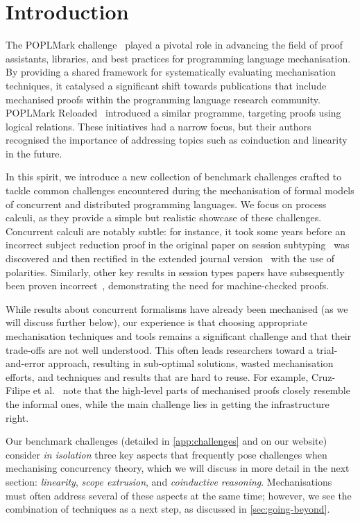 \documentclass[runningheads]{llncs}
\begin{document}
\section{Introduction}
The POPLMark challenge~\cite{POPLMark}
played a pivotal role in advancing the field of proof assistants,
libraries, and best practices for programming language
mechanisation. By providing a shared framework for systematically
evaluating mechanisation techniques, it catalysed a significant
shift towards publications that include mechanised proofs within the programming language research community.
POPLMark Reloaded~\cite{POPLMarkReloaded} introduced a similar programme, targeting proofs using logical relations.
These initiatives had a narrow focus, but their authors recognised the importance of addressing topics such as coinduction and linearity in the future.

In this spirit, we introduce a new collection of benchmark challenges
crafted to tackle common challenges encountered during
the mechanisation of formal models of concurrent and distributed
programming languages.  We focus on process calculi, as
they provide a simple but realistic showcase of these challenges.  Concurrent calculi are
notably subtle: for instance, it took some years before an incorrect
subject reduction proof in the original paper on session
subtyping~\cite{GH99} was discovered and then rectified in the extended journal version~\cite{GH05} with the use of
polarities.
Similarly, other key results in session types papers have subsequently
been proven incorrect~\cite{Gay2020,10.1145/3290343}, demonstrating the
need for machine-checked proofs.

While results about concurrent
formalisms have already been mechanised (as we will discuss further
below), our experience is that choosing appropriate mechanisation
techniques and tools remains a significant challenge and that their
trade-offs are not well understood.  This often leads researchers
toward a trial-and-error approach, resulting in sub-optimal solutions,
wasted mechanisation efforts, and techniques and results that are hard
to reuse. For example, Cruz-Filipe et al.~\cite{Cruz-Filipe2021b} note that the high-level parts of
mechanised proofs closely resemble the informal ones, while the
main challenge lies in getting the infrastructure right.

Our benchmark challenges (detailed in \cref{app:challenges} and on our website) consider
\emph{in isolation} three key aspects that frequently pose challenges
when mechanising concurrency theory, which we will discuss in more detail in the next section: \emph{linearity}, \emph{scope
  extrusion}, and \emph{coinductive reasoning}.
Mechanisations must often address several of these aspects at the same time; however, we
see the combination of techniques as a next
step, as discussed in \cref{sec:going-beyond}.
\end{document}
